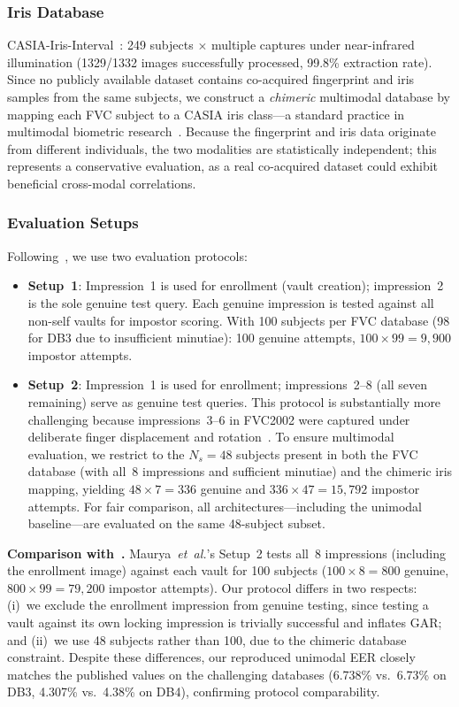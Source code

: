 \documentclass[3p,twocolumn]{elsarticle}
\begin{document}
\subsubsection{Iris Database}
CASIA-Iris-Interval~\cite{casia_iris}: 249 subjects $\times$ multiple captures under near-infrared illumination (1329/1332 images successfully processed, 99.8\% extraction rate). Since no publicly available dataset contains co-acquired fingerprint and iris samples from the same subjects, we construct a \emph{chimeric} multimodal database by mapping each FVC subject to a CASIA iris class---a standard practice in multimodal biometric research~\cite{ross2003information,nandakumar2008multibiometric}. Because the fingerprint and iris data originate from different individuals, the two modalities are statistically independent; this represents a conservative evaluation, as a real co-acquired dataset could exhibit beneficial cross-modal correlations.

\subsubsection{Evaluation Setups}
Following~\cite{maurya2025enhancing}, we use two evaluation protocols:
\begin{itemize}
    \item \textbf{Setup~1}: Impression~1 is used for enrollment (vault creation); impression~2 is the sole genuine test query. Each genuine impression is tested against all non-self vaults for impostor scoring. With 100 subjects per FVC database (98 for DB3 due to insufficient minutiae): 100 genuine attempts, $100 \times 99 = 9{,}900$ impostor attempts.
    \item \textbf{Setup~2}: Impression~1 is used for enrollment; impressions~2--8 (all seven remaining) serve as genuine test queries. This protocol is substantially more challenging because impressions~3--6 in FVC2002 were captured under deliberate finger displacement and rotation~\cite{maio2002fvc2002}. To ensure multimodal evaluation, we restrict to the $N_s = 48$ subjects present in both the FVC database (with all~8 impressions and sufficient minutiae) and the chimeric iris mapping, yielding $48 \times 7 = 336$ genuine and $336 \times 47 = 15{,}792$ impostor attempts. For fair comparison, all architectures---including the unimodal baseline---are evaluated on the same 48-subject subset.
\end{itemize}

\noindent\textbf{Comparison with~\cite{maurya2025enhancing}.} Maurya~\textit{et~al.}'s Setup~2 tests all~8 impressions (including the enrollment image) against each vault for 100 subjects ($100 \times 8 = 800$ genuine, $800 \times 99 = 79{,}200$ impostor attempts). Our protocol differs in two respects: (i)~we exclude the enrollment impression from genuine testing, since testing a vault against its own locking impression is trivially successful and inflates GAR; and (ii)~we use 48 subjects rather than 100, due to the chimeric database constraint. Despite these differences, our reproduced unimodal EER closely matches the published values on the challenging databases (6.738\% vs.~6.73\% on DB3, 4.307\% vs.~4.38\% on DB4), confirming protocol comparability.
\end{document}
